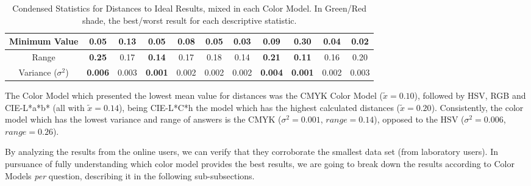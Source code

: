 \begin{table}[htbp]
{\begin{tabular}{@{}ccccccccccc@{}}
    \multicolumn{1}{c|}{Minimum Value}                                                 & 0.05  & 0.13       & 0.05                                   & 0.08  & \multicolumn{1}{c|}{0.05}                                  & 0.03                                  & 0.09       & 0.30                                   & 0.04                                  & \multicolumn{1}{c|}{0.02}  \\ \midrule
    \multicolumn{1}{c|}{Range}                                                         & \cellcolor[HTML]{FD6864}\textbf{0.25}  & 0.17       & \cellcolor[HTML]{32CB00}\textbf{0.14}  & 0.17  & \multicolumn{1}{c|}{0.18}                                  & 0.14                                  & \cellcolor[HTML]{FD6864}\textbf{0.21}       & \cellcolor[HTML]{32CB00}\textbf{0.11}  & 0.16                                  & \multicolumn{1}{c|}{0.20}  \\ \midrule
    \multicolumn{1}{c|}{Variance ($\sigma^2$)}                                                      & \cellcolor[HTML]{FD6864}\textbf{0.006} & 0.003      & \cellcolor[HTML]{32CB00}\textbf{0.001} & 0.002 & \multicolumn{1}{c|}{0.002}                                 & 0.002                                 & \cellcolor[HTML]{FD6864}\textbf{0.004}      & \cellcolor[HTML]{32CB00}\textbf{0.001} & 0.002                                 & \multicolumn{1}{c|}{0.003} \\ \bottomrule
  \end{tabular}}
  \caption[Condensed Statistics for Distances to Ideal Results, mixed in each Color Model.]{Condensed Statistics for Distances to Ideal Results, mixed in each Color Model. In Green/Red shade, the best/worst result for each descriptive statistic.}
  \label{table:colormodels_distances_labonline_statistics}
\end{table}
%
The Color Model which presented the lowest mean value for distances was the CMYK Color Model ($\tilde{x} = 0.10$), followed by HSV, RGB and CIE-L*a*b* (all with $\tilde{x} = 0.14$), being
CIE-L*C*h the model which has the highest calculated distances ($\tilde{x} = 0.20$). Consistently, the color model which has the lowest variance and range of answers is the CMYK ($\sigma^2 = 0.001$,
$range = 0.14$), opposed to the HSV ($\sigma^2 = 0.006$, $range = 0.26$). \par
%
By analyzing the results from the online users, we can verify that they corroborate the smallest data set (from laboratory users). In pursuance of fully understanding which color model provides the best results,
we are going to break down the results according to Color Models \emph{per} question, describing it in the following sub-subsections. \par
%
%
